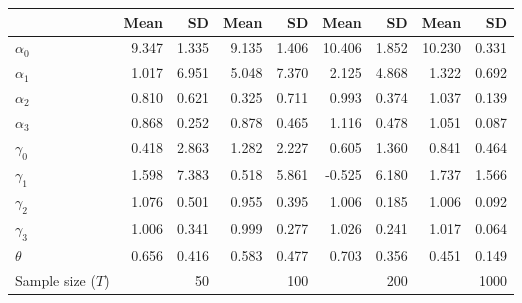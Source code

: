 
\begin{tabular}[t]{lrrrrrrrr}
\toprule
  & Mean & SD & Mean  & SD  & Mean   & SD   & Mean    & SD   \\
\midrule
$\alpha_{0}$ & 9.347 & 1.335 & 9.135 & 1.406 & 10.406 & 1.852 & 10.230 & 0.331\\
$\alpha_{1}$ & 1.017 & 6.951 & 5.048 & 7.370 & 2.125 & 4.868 & 1.322 & 0.692\\
$\alpha_{2}$ & 0.810 & 0.621 & 0.325 & 0.711 & 0.993 & 0.374 & 1.037 & 0.139\\
$\alpha_{3}$ & 0.868 & 0.252 & 0.878 & 0.465 & 1.116 & 0.478 & 1.051 & 0.087\\
$\gamma_{0}$ & 0.418 & 2.863 & 1.282 & 2.227 & 0.605 & 1.360 & 0.841 & 0.464\\
$\gamma_{1}$ & 1.598 & 7.383 & 0.518 & 5.861 & -0.525 & 6.180 & 1.737 & 1.566\\
$\gamma_{2}$ & 1.076 & 0.501 & 0.955 & 0.395 & 1.006 & 0.185 & 1.006 & 0.092\\
$\gamma_{3}$ & 1.006 & 0.341 & 0.999 & 0.277 & 1.026 & 0.241 & 1.017 & 0.064\\
$\theta$ & 0.656 & 0.416 & 0.583 & 0.477 & 0.703 & 0.356 & 0.451 & 0.149\\
Sample size ($T$) &  & 50 &  & 100 &  & 200 &  & 1000\\
\bottomrule
\end{tabular}
